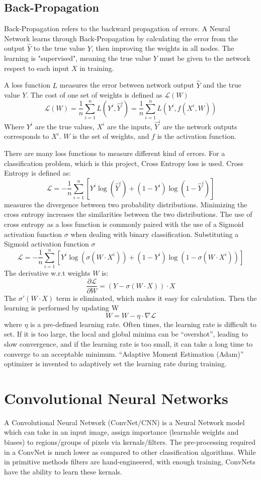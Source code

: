 \subsection{Back-Propagation}
Back-Propagation refers to the backward propagation of errors. A Neural Network learns through Back-Propagation by calculating the error from the output $\hat{Y}$ to the true value $Y$, then improving the weights in all nodes. The learning is "supervised", meaning the true value $Y$ must be given to the network respect to each input $X$ in training.

A loss function $L$ measures the error between network output $\hat{Y}$ and the true value $Y$. The cost of one set of weights is defined as $\mathcal{L}(W)$
$$\mathcal{L}(W)= \frac{\mathrm{1}}{n}\sum_{i=1}^{n} L(Y^i,\hat{Y}^i) = \frac{\mathrm{1}}{n}\sum_{i=1}^{n} L(Y^i,f(X^i,W))$$
Where $Y^i$ are the true values, $X^i$ are the inputs, $\hat{Y}^i$ are the network outputs corresponds to $X^i$. $W$ is the set of weights, and $f$ is the activation function.

There are many loss functions to measure different kind of errors. For a classification problem, which is this project, Cross Entropy loss is used. Cross Entropy is defined as:
$$\mathcal{L}=-\frac{\mathrm{1}}{n}\sum_{i=1}^{n}[Y^i \log(\hat{Y}^i)+(1-Y^i) \log(1-\hat{Y}^i)]$$
measures the divergence between two probability distributions. Minimizing the cross entropy increases the similarities between the two distributions. The use of cross entropy as a loss function is commonly paired with the use of a Sigmoid activation function $\sigma$ when dealing with binary classification. Substituting a Sigmoid activation function $\sigma$
$$\mathcal{L}=-\frac{\mathrm{1}}{n}\sum_{i=1}^{n}[Y^i \log(\sigma(W \cdot X^i))+(1-Y^i) \log(1-\sigma(W \cdot X^i))]$$
The derivative w.r.t weights $W$ is:
$$\frac{\partial \mathcal{L}}{\partial W} = (Y - \sigma(W \cdot X))\cdot X$$
The $\sigma'(W \cdot X)$ term is eliminated, which makes it easy for calculation.
Then the learning is performed by updating W
$$ W = W - \eta\cdot\nabla\mathcal{L}$$
where $\eta$ is a pre-defined learning rate. Often times, the learning rate is difficult to set. If it is too large, the local and global minima can be “overshot”, leading to slow convergence, and if the learning rate is too small, it can take a long time to converge to an acceptable minimum. “Adaptive Moment Estimation (Adam)” optimizer is invented to adaptively set the learning rate during training.


\section{Convolutional Neural Networks}
A Convolutional Neural Network (ConvNet/CNN) is a Neural Network model which can take in an input image, assign importance (learnable weights and biases) to regions/groups of pixels via kernals/filters. The pre-processing required in a ConvNet is much lower as compared to other classification algorithms. While in primitive methods filters are hand-engineered, with enough training, ConvNets have the ability to learn these kernals.

